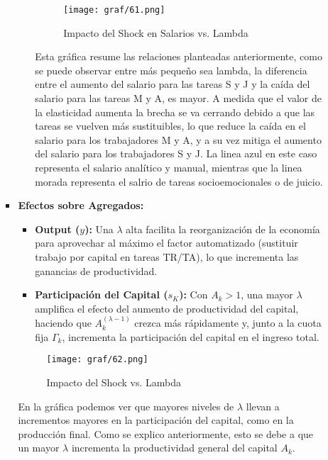 \documentclass{article}
\theoremstyle{remark}
\theoremstyle{definition}
\begin{document}
\begin{enumerate}
\begin{tcolorbox}[title= Soluci\'on 5]
\begin{itemize}
\begin{itemize}
\begin{enumerate}[label=\alph*)]
            \begin{figure}[H] 
                \centering
                \texttt{[image: graf/61.png]}
                \caption{Impacto del Shock en Salarios  vs. Lambda}
                \label{fig:graflamb}
            \end{figure}
            Esta gr\'afica resume las relaciones planteadas anteriormente, como se puede observar entre m\'as pequeño sea lambda, la diferencia entre el aumento del salario para las tareas S y J y la caída del salario para las tareas M y A, es mayor. A medida que el valor de la elasticidad aumenta la brecha se va cerrando debido a que las tareas se vuelven m\'as sustituibles, lo que reduce la ca\'ida en el salario para los trabajadores M y A, y a su vez mitiga el aumento del salario para los trabajadores S y J. La linea azul en este caso representa el salario anal\'itico y manual,  mientras que la linea morada representa el salrio de tareas socioemocionales o de juicio.
        \end{enumerate}
        
      \item \textbf{Efectos sobre Agregados:}
        \begin{itemize}
          \item \textbf{Output (\(y\)):} Una \(\lambda\) alta facilita la reorganización de la economía para aprovechar al máximo el factor automatizado (sustituir trabajo por capital en tareas TR/TA), lo que incrementa las ganancias de productividad.
          \item \textbf{Participación del Capital (\(s_K\)):} Con \(A_k > 1\), una mayor \(\lambda\) amplifica el efecto del aumento de productividad del capital, haciendo que \(A_k^{(\lambda-1)}\) crezca más rápidamente y, junto a la cuota fija \(\Gamma_k\), incrementa la participación del capital en el ingreso total.
        \end{itemize}
            \begin{figure}[H] 
                \centering
                \texttt{[image: graf/62.png]}
                \caption{Impacto del Shock vs. Lambda}
                \label{fig:graflamb}
            \end{figure}
            En la gr\'afica podemos ver que mayores niveles de $\lambda$ llevan a incrementos mayores en la participaci\'on del capital, como en la producci\'on final. Como se explico anteriormente, esto se debe a que un mayor $\lambda$ incrementa la productividad general del capital $A_k$.
    \end{itemize}
    

\end{itemize}
\end{tcolorbox}
\end{enumerate}
\end{document}
